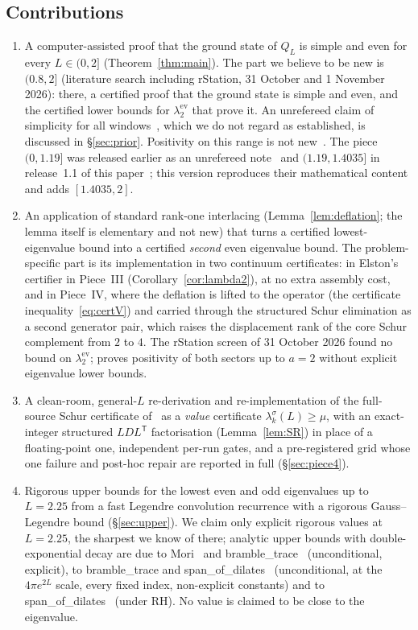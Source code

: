 \documentclass[11pt]{amsart}
\newcommand{\Lmax}{2}                                     %
\newcommand{\ev}{\mathrm{ev}}
\newcommand{\Tp}{\mathsf T}
\theoremstyle{definition}
\theoremstyle{remark}
\numberwithin{equation}{section}
\begin{document}
\subsection{Contributions}
\begin{enumerate}
\item A computer-assisted proof that the ground state of $Q_L$ is simple and even for every $L\in(0,\Lmax]$ (Theorem~\ref{thm:main}). The part we believe to be new is $(0.8,\Lmax]$ (literature search including rStation, 31 October and 1 November 2026): there, a certified proof that the ground state is simple and even, and the certified lower bounds for $\lambda_2^\ev$ that prove it. An unrefereed claim of simplicity for all windows~\cite{Siche}, which we do not regard as established, is discussed in \S\ref{sec:prior}. Positivity on this range is not new~\cite{rh45,rh60}. The piece $(0,1.19]$ was released earlier as an unrefereed note~\cite{Botha} and $(1.19,1.4035]$ in release~1.1 of this paper~\cite{Botha11}; this version reproduces their mathematical content and adds $[1.4035,2]$.
\item An application of standard rank-one interlacing (Lemma~\ref{lem:deflation}; the lemma itself is elementary and not new) that turns a certified lowest-eigenvalue bound into a certified \emph{second} even eigenvalue bound. The problem-specific part is its implementation in two continuum certificates: in Elston's certifier in Piece~III (Corollary~\ref{cor:lambda2}), at no extra assembly cost, and in Piece~IV, where the deflation is lifted to the operator (the certificate inequality~\eqref{eq:certV}) and carried through the structured Schur elimination as a second generator pair, which raises the displacement rank of the core Schur complement from $2$ to $4$. The rStation screen of 31 October 2026 found no bound on $\lambda_2^\ev$; \cite{rh60} proves positivity of both sectors up to $a=2$ without explicit eigenvalue lower bounds.
\item A clean-room, general-$L$ re-derivation and re-implementation of the full-source Schur certificate of~\cite{rh60} as a \emph{value} certificate $\lambda_k^\sigma(L)\ge\mu$, with an exact-integer structured $LDL^{\Tp}$ factorisation (Lemma~\ref{lem:SR}) in place of a floating-point one, independent per-run gates, and a pre-registered grid whose one failure and post-hoc repair are reported in full (\S\ref{sec:piece4}).
\item Rigorous upper bounds for the lowest even and odd eigenvalues up to $L=2.25$ from a fast Legendre convolution recurrence with a rigorous Gauss--Legendre bound (\S\ref{sec:upper}). We claim only explicit rigorous values at $L=2.25$, the sharpest we know of there; analytic upper bounds with double-exponential decay are due to Mori~\cite[Thm.~K]{MoriV} and bramble\_trace~\cite[Thm.~2.1]{rh25} (unconditional, explicit), to bramble\_trace and span\_of\_dilates~\cite[Cor.~2]{rh83} (unconditional, at the $4\pi e^{2L}$ scale, every fixed index, non-explicit constants) and to span\_of\_dilates~\cite[Thm.~1]{rh81} (under RH). No value is claimed to be close to the eigenvalue.

\end{enumerate}
\end{document}
